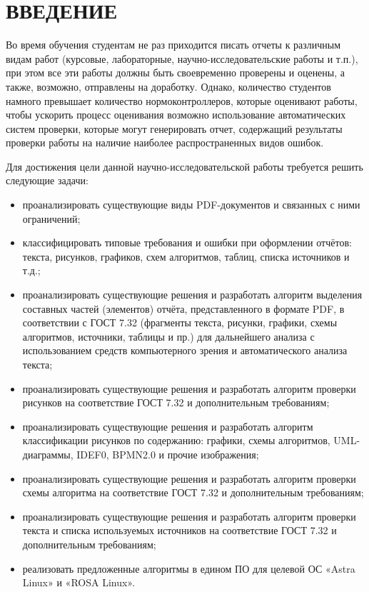 \chapter*{ВВЕДЕНИЕ}

Во время обучения студентам не раз приходится писать отчеты к различным видам работ (курсовые, лабораторные, научно-исследовательские работы и т.п.), при этом все эти работы должны быть своевременно проверены и оценены, а также, возможно, отправлены на доработку. Однако, количество студентов намного превышает количество нормоконтроллеров, которые оценивают работы, чтобы ускорить процесс оценивания возможно использование автоматических систем проверки, которые могут генерировать отчет, содержащий результаты проверки работы на наличие наиболее распространенных видов ошибок.

Для достижения цели данной научно-исследовательской работы требуется решить следующие задачи:
\begin{itemize}
	\item проанализировать существующие виды PDF-документов и связанных с ними ограничений;
	\item классифицировать типовые требования и ошибки при оформлении отчётов: текста, рисунков, графиков, схем алгоритмов, таблиц, списка источников и т.д.;
	\item проанализировать существующие решения и разработать алгоритм выделения составных частей (элементов) отчёта, представленного в формате PDF, в соответствии с ГОСТ 7.32 (фрагменты текста, рисунки, графики, схемы алгоритмов, источники, таблицы и пр.) для дальнейшего анализа с использованием средств компьютерного зрения и автоматического анализа текста;
	\item проанализировать существующие решения и разработать алгоритм проверки рисунков на соответствие ГОСТ 7.32 и дополнительным требованиям;
	\item проанализировать существующие решения и разработать алгоритм классификации рисунков по содержанию: графики, схемы алгоритмов, UML-диаграммы, IDEF0, BPMN2.0 и прочие изображения;
	\item проанализировать существующие решения и разработать алгоритм проверки схемы алгоритма на соответствие ГОСТ 7.32 и дополнительным требованиям;
	\item проанализировать существующие решения и разработать алгоритм проверки текста и списка используемых источников на соответствие ГОСТ 7.32 и дополнительным требованиям;
	\item реализовать предложенные алгоритмы в едином ПО для целевой ОС «Astra Linux» и «ROSA Linux».
\end{itemize}
